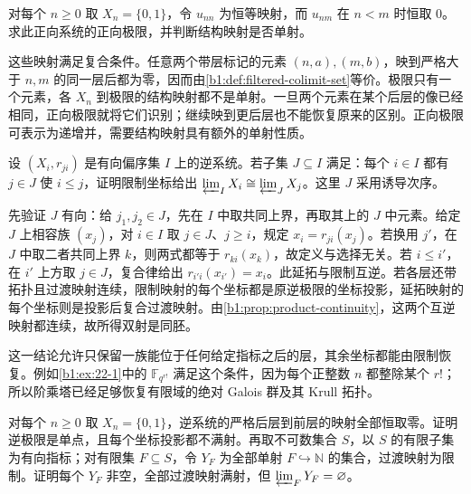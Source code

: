 \begin{exercise}\label{b1:ex:A-05}
	对每个 \(n\geq0\) 取 \(X_n=\{0,1\}\)，令 \(u_{nn}\) 为恒等映射，而 \(u_{nm}\) 在 \(n<m\) 时恒取 \(0\)。求此正向系统的正向极限，并判断结构映射是否单射。
\end{exercise}

\begin{solution}
	这些映射满足复合条件。任意两个带层标记的元素 \((n,a),(m,b)\)，映到严格大于 \(n,m\) 的同一层后都为零，因而由\cref{b1:def:filtered-colimit-set}等价。极限只有一个元素，各 \(X_n\) 到极限的结构映射都不是单射。一旦两个元素在某个后层的像已经相同，正向极限就将它们识别；继续映到更后层也不能恢复原来的区别。正向极限可表示为递增并，需要结构映射具有额外的单射性质。
\end{solution}

\begin{exercise}\label{b1:ex:A-06}
	设 \((X_i,r_{ji})\) 是有向偏序集 \(I\) 上的逆系统。若子集 \(J\subseteq I\) 满足：每个 \(i\in I\) 都有 \(j\in J\) 使 \(i\leq j\)，证明限制坐标给出 \(\varprojlim_I X_i\cong\varprojlim_J X_j\)。这里 \(J\) 采用诱导次序。
\end{exercise}

\begin{solution}
	先验证 \(J\) 有向：给 \(j_1,j_2\in J\)，先在 \(I\) 中取共同上界，再取其上的 \(J\) 中元素。给定 \(J\) 上相容族 \((x_j)\)，对 \(i\in I\) 取 \(j\in J\)、\(j\geq i\)，规定 \(x_i=r_{ji}(x_j)\)。若换用 \(j'\)，在 \(J\) 中取二者共同上界 \(k\)，则两式都等于 \(r_{ki}(x_k)\)，故定义与选择无关。若 \(i\leq i'\)，在 \(i'\) 上方取 \(j\in J\)，复合律给出 \(r_{i'i}(x_{i'})=x_i\)。此延拓与限制互逆。若各层还带拓扑且过渡映射连续，限制映射的每个坐标都是原逆极限的坐标投影，延拓映射的每个坐标则是投影后复合过渡映射。由\cref{b1:prop:product-continuity}，这两个互逆映射都连续，故所得双射是同胚。

	这一结论允许只保留一族能位于任何给定指标之后的层，其余坐标都能由限制恢复。例如\cref{b1:ex:22-1}中的 \(\mathbb F_{q^{r!}}\) 满足这个条件，因为每个正整数 \(n\) 都整除某个 \(r!\)；所以阶乘塔已经足够恢复有限域的绝对 Galois 群及其 Krull 拓扑。
\end{solution}

\begin{exercise}\label{b1:ex:A-07}
	对每个 \(n\geq0\) 取 \(X_n=\{0,1\}\)，逆系统的严格后层到前层的映射全部恒取零。证明逆极限是单点，且每个坐标投影都不满射。再取不可数集合 \(S\)，以 \(S\) 的有限子集为有向指标；对有限集 \(F\subseteq S\)，令 \(Y_F\) 为全部单射 \(F\hookrightarrow\mathbb N\) 的集合，过渡映射为限制。证明每个 \(Y_F\) 非空，全部过渡映射满射，但 \(\varprojlim_FY_F=\varnothing\)。
\end{exercise}

